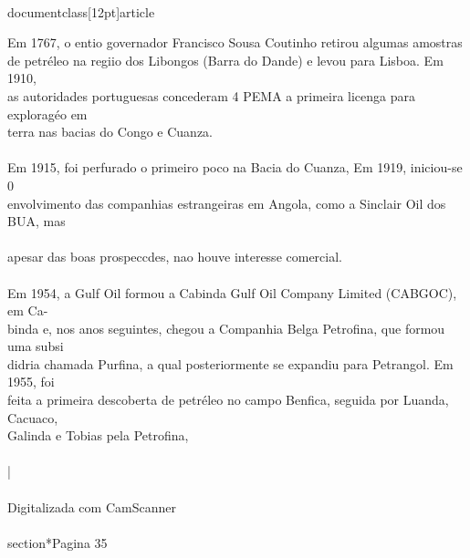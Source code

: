 \\documentclass[12pt]{article}
\begin{document}
{Em 1767, o entio governador Francisco Sousa Coutinho retirou algumas amostras\\
de petréleo na regiio dos Libongos (Barra do Dande) e levou para Lisboa. Em 1910,\\
as autoridades portuguesas concederam 4 PEMA a primeira licenga para exploragéo em\\
terra nas bacias do Congo e Cuanza.\\
\\
Em 1915, foi perfurado o primeiro poco na Bacia do Cuanza, Em 1919, iniciou-se 0\\
envolvimento das companhias estrangeiras em Angola, como a Sinclair Oil dos BUA, mas\\
\\
apesar das boas prospeccdes, nao houve interesse comercial.\\
\\
Em 1954, a Gulf Oil formou a Cabinda Gulf Oil Company Limited (CABGOC), em Ca-\\
binda e, nos anos seguintes, chegou a Companhia Belga Petrofina, que formou uma subsi\\
didria chamada Purfina, a qual posteriormente se expandiu para Petrangol. Em 1955, foi\\
feita a primeira descoberta de petréleo no campo Benfica, seguida por Luanda, Cacuaco,\\
Galinda e Tobias pela Petrofina,\\
\\
|\\
\\
Digitalizada com CamScanner\\

\\section*{Pagina 35}

}
\end{document}
